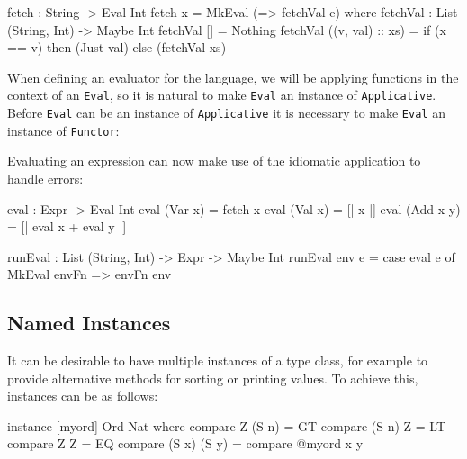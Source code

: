 \begin{code}
fetch : String -> Eval Int
fetch x = MkEval (\e => fetchVal e) where
    fetchVal : List (String, Int) -> Maybe Int
    fetchVal [] = Nothing
    fetchVal ((v, val) :: xs) = if (x == v)
                                  then (Just val)
                                  else (fetchVal xs)
\end{code} 
  
\noindent
When defining an evaluator for the language, we will be applying functions in the context of an \texttt{Eval}, so it is natural to make \texttt{Eval} an instance of \texttt{Applicative}.
Before \texttt{Eval} can be an instance of \texttt{Applicative} it is necessary to make \texttt{Eval} an instance of \texttt{Functor}:


\noindent
Evaluating an expression can now make use of the idiomatic application to handle errors:

\begin{code}
eval : Expr -> Eval Int
eval (Var x)   = fetch x
eval (Val x)   = [| x |]
eval (Add x y) = [| eval x + eval y |]
  
runEval : List (String, Int) -> Expr -> Maybe Int
runEval env e = case eval e of
    MkEval envFn => envFn env
\end{code} 

\subsection{Named Instances}

It can be desirable to have multiple instances of a type class, for example to provide alternative methods for sorting or printing values.
To achieve this, instances can be  as follows:

\begin{code}
instance [myord] Ord Nat where
   compare Z (S n)     = GT
   compare (S n) Z     = LT
   compare Z Z         = EQ
   compare (S x) (S y) = compare @{myord} x y
\end{code}

